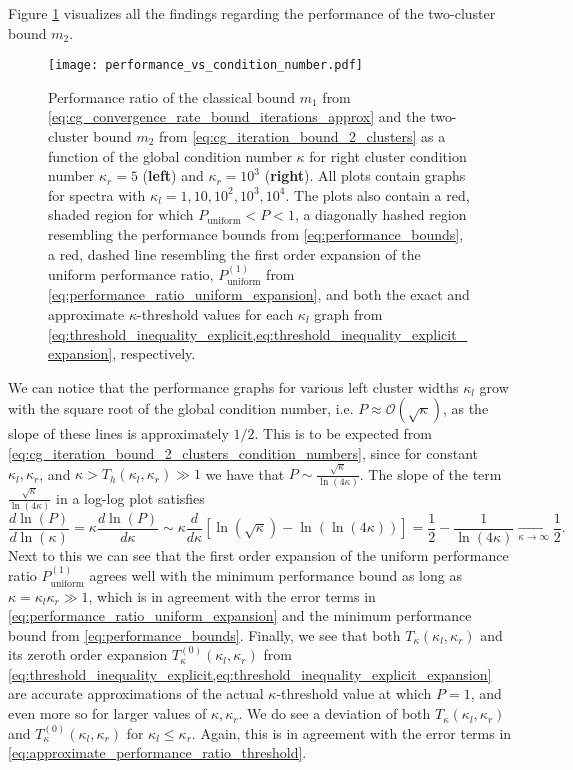 Figure \ref{fig:two_cluster_bound_performance} visualizes all the findings regarding the performance of the two-cluster bound $m_2$.
\begin{figure}[H]
    \centering
    \texttt{[image: performance\_vs\_condition\_number.pdf]}
    \caption{Performance ratio of the classical bound $m_1$ from \cref{eq:cg_convergence_rate_bound_iterations_approx} and the two-cluster bound $m_2$ from \cref{eq:cg_iteration_bound_2_clusters} as a function of the global condition number $\kappa$ for right cluster condition number $\kappa_r = 5$ (\textbf{left}) and $\kappa_r = 10^3$ (\textbf{right}). All plots contain graphs for spectra with $\kappa_l = 1, 10, 10^2, 10^3, 10^4$. The plots also contain a red, shaded region for which $P_{\text{uniform}} < P < 1$, a diagonally hashed region resembling the performance bounds from \cref{eq:performance_bounds}, a red, dashed line resembling the first order expansion of the uniform performance ratio, $P^{(1)}_{\text{uniform}}$ from \cref{eq:performance_ratio_uniform_expansion}, and both the exact and approximate $\kappa$-threshold values for each $\kappa_l$ graph from \cref{eq:threshold_inequality_explicit,eq:threshold_inequality_explicit_expansion}, respectively.}
    \label{fig:two_cluster_bound_performance}
\end{figure}
We can notice that the performance graphs for various left cluster widths $\kappa_l$ grow with the square root of the global condition number, i.e. $P \approx \mathcal{O}(\sqrt{\kappa})$, as the slope of these lines is approximately $1/2$. This is to be expected from \cref{eq:cg_iteration_bound_2_clusters_condition_numbers}, since for constant $\kappa_l,\kappa_r$, and $\kappa > T_h(\kappa_l, \kappa_r) \gg 1$ we have that $P \sim \frac{\sqrt{\kappa}}{\ln(4\kappa)}$. The slope of the term $\frac{\sqrt{\kappa}}{\ln(4\kappa)}$ in a log-log plot satisfies
\[
    \frac{d\ln(P)}{d\ln(\kappa)} =\kappa\frac{d\ln(P)}{d\kappa} \sim \kappa\frac{d}{d\kappa} \left[\ln(\sqrt{\kappa}) - \ln(\ln(4\kappa))\right] = \frac{1}{2} - \frac{1}{\ln(4\kappa)} \underset{\kappa\to\infty}{\longrightarrow} \frac{1}{2}.
\]
Next to this we can see that the first order expansion of the uniform performance ratio $P^{(1)}_{\text{uniform}}$ agrees well with the minimum performance bound as long as $\kappa = \kappa_l\kappa_r \gg 1$, which is in agreement with the error terms in \cref{eq:performance_ratio_uniform_expansion} and the minimum performance bound from \cref{eq:performance_bounds}. Finally, we see that both $T_{\kappa}(\kappa_l, \kappa_r)$ and its zeroth order expansion $T^{(0)}_{\kappa}(\kappa_l, \kappa_r)$ from \cref{eq:threshold_inequality_explicit,eq:threshold_inequality_explicit_expansion} are accurate approximations of the actual $\kappa$-threshold value at which $P=1$, and even more so for larger values of $\kappa,\kappa_r$. We do see a deviation of both $T_{\kappa}(\kappa_l, \kappa_r)$ and $T^{(0)}_{\kappa}(\kappa_l, \kappa_r)$ for $\kappa_l\leq\kappa_r$. Again, this is in agreement with the error terms in \cref{eq:approximate_performance_ratio_threshold}.

